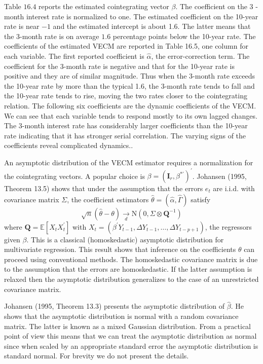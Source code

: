 \documentclass[10pt]{article}
\begin{document}
Table $16.4$ reports the estimated cointegrating vector $\beta$. The coefficient on the 3 -month interest rate is normalized to one. The estimated coefficient on the 10-year rate is near $-1$ and the estimated intercept is about 1.6. The latter means that the 3-month rate is on average $1.6$ percentage points below the 10-year rate. The coefficients of the estimated VECM are reported in Table 16.5, one column for each variable. The first reported coefficient is $\widehat{\alpha}$, the error-correction term. The coefficient for the 3-month rate is negative and that for the 10-year rate is positive and they are of similar magnitude. Thus when the 3-month rate exceeds the 10-year rate by more than the typical 1.6, the 3-month rate tends to fall and the 10-year rate tends to rise, moving the two rates closer to the cointegrating relation. The following six coefficients are the dynamic coefficients of the VECM. We can see that each variable tends to respond mostly to its own lagged changes. The 3-month interest rate has considerably larger coefficients than the 10-year rate indicating that it has stronger serial correlation. The varying signs of the coefficients reveal complicated dynamics..

An asymptotic distribution of the VECM estimator requires a normalization for the cointegrating vectors. A popular choice is $\beta=\left(\boldsymbol{I}_{r}, \beta^{* \prime}\right)^{\prime}$. Johansen (1995, Theorem 13.5) shows that under the assumption that the errors $e_{t}$ are i.i.d. with covariance matrix $\Sigma$, the coefficient estimators $\widehat{\theta}=(\widehat{\alpha}, \widehat{\Gamma})$ satisfy
$$
\sqrt{n}(\widehat{\theta}-\theta) \underset{d}{\longrightarrow} \mathrm{N}\left(0, \Sigma \otimes \boldsymbol{Q}^{-1}\right)
$$
where $\boldsymbol{Q}=\mathbb{E}\left[X_{t} X_{t}^{\prime}\right]$ with $X_{t}=\left(\beta^{\prime} Y_{t-1}, \Delta Y_{t-1}, \ldots, \Delta Y_{t-p+1}\right)$, the regressors given $\beta$. This is a classical (homoskedastic) asymptotic distribution for multivariate regression. This result shows that inference on the coefficients $\theta$ can proceed using conventional methods. The homoskedastic covariance matrix is due to the assumption that the errors are homoskedastic. If the latter assumption is relaxed then the asymptotic distribution generalizes to the case of an unrestricted covariance matrix.

Johansen (1995, Theorem 13.3) presents the asymptotic distribution of $\widehat{\beta}$. He shows that the asymptotic distribution is normal with a random covariance matrix. The latter is known as a mixed Gaussian distribution. From a practical point of view this means that we can treat the asymptotic distribution as normal since when scaled by an appropriate standard error the asymptotic distribution is standard normal. For brevity we do not present the details.
\end{document}
